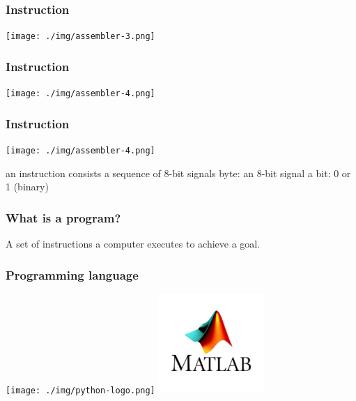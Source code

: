\documentclass[11pt]{beamer}
\begin{document}
\begin{frame}[fragile]
  \frametitle{Instruction}

  \texttt{[image: ./img/assembler-3.png]}
\end{frame}

\begin{frame}[fragile]
  \frametitle{Instruction}

  \texttt{[image: ./img/assembler-4.png]}
\end{frame}

\fi



\begin{frame}[fragile]
  \frametitle{Instruction}

  \texttt{[image: ./img/assembler-4.png]}\pause
  \begin{itemize}
    \myitem an instruction consists a sequence of 8-bit signals
    \myitem byte: an 8-bit signal
    \myitem a bit: 0 or 1 (binary)
  \end{itemize}
\end{frame}


\begin{frame}
  \frametitle{What is a program?}
  \Enlarge

  \begin{itemize} \pause
    \myitem A set of instructions a computer executes to achieve a goal.
  \end{itemize}
\end{frame}


\begin{frame}[fragile]
  \frametitle{Programming language}

  \texttt{[image: ./img/python-logo.png]} \hspace{5mm}
  \includegraphics[width=0.3\textwidth]{./img/matlab.png}  \\
  \hspace{5mm}{\small Python}
\end{frame}
\end{document}
